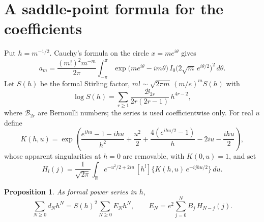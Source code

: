 \documentclass[11pt,a4paper]{article}
\newtheorem{proposition}[theorem]{Proposition}
\theoremstyle{remark}
\begin{document}
\section{A saddle-point formula for the coefficients}\label{sec:saddle}

Put $h=m^{-1/2}$. Cauchy's formula on the circle $x=me^{i\theta}$ gives
\[
  a_m=\frac{(m!)^2m^{-m}}{2\pi}\int_{-\pi}^{\pi}\exp\bigl(me^{i\theta}-im\theta\bigr)\,I_0\bigl(2\sqrt m\,e^{i\theta/2}\bigr)^2\,d\theta .
\]
Let $S(h)$ be the formal Stirling factor, $m!\sim\sqrt{2\pi m}\,(m/e)^mS(h)$ with
\[
  \log S(h)=\sum_{r\ge1}\frac{\mathcal B_{2r}}{2r(2r-1)}\,h^{4r-2},
\]
where $\mathcal B_{2r}$ are Bernoulli numbers; the series is used coefficientwise only. For real $u$ define
\[
  K(h,u)=\exp\!\left(\frac{e^{ihu}-1-ihu}{h^2}+\frac{u^2}2+\frac{4(e^{ihu/2}-1)}h-2iu-\frac{ihu}2\right),
\]
whose apparent singularities at $h=0$ are removable, with $K(0,u)=1$, and set
\[
  H_l(j)=\frac1{\sqrt{2\pi}}\int_{\mathbb R}e^{-u^2/2+2iu}\,[h^l]\bigl\{K(h,u)\,e^{-ijhu/2}\bigr\}\,du .
\]

\begin{proposition}\label{prop:formula}
As formal power series in $h$,
\begin{equation}\label{eq:formula}
  \sum_{N\ge0}d_Nh^N=S(h)^2\sum_{N\ge0}E_Nh^N,\qquad E_N=e^2\sum_{j=0}^NB_j\,H_{N-j}(j).
\end{equation}
\end{proposition}
\end{document}

